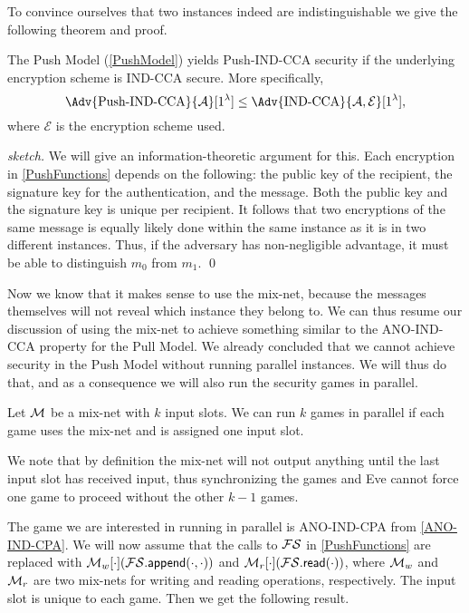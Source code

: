 To convince ourselves that two instances indeed are indistinguishable we give 
the following theorem and proof.

\begin{theorem}
  The Push Model (\cref{PushModel}) yields Push-IND-CCA security if the 
  underlying encryption scheme is IND-CCA secure.
  More specifically,
  \begin{equation*}
    \Adv{\text{Push-IND-CCA}}{\A}[1^\lambda]\leq \Adv{\text{IND-CCA}}{\A, 
      \mathcal{E}}[1^\lambda],
  \end{equation*}
  where \(\mathcal{E}\) is the encryption scheme used.
\end{theorem}

\begin{proof}[sketch]
  We will give an information-theoretic argument for this.
  Each encryption in \cref{PushFunctions} depends on the following:
  the public key of the recipient, the signature key for the authentication, 
  and the message.
  Both the public key and the signature key is unique per recipient.
  It follows that two encryptions of the same message is equally likely done 
  within the same instance as it is in two different instances.
  Thus, if the adversary has non-negligible advantage, it must be able to 
  distinguish \(m_0\) from \(m_1\).
  \qed{}
\end{proof}

Now we know that it makes sense to use the mix-net, because the messages 
themselves will not reveal which instance they belong to.
We can thus resume our discussion of using the mix-net to achieve something 
similar to the ANO-IND-CCA property for the Pull Model.
We already concluded that we cannot achieve security in the Push Model without 
running parallel instances.
We will thus do that, and as a consequence we will also run the security games 
in parallel.

\begin{definition}
  Let \(\operatorname{\mathcal{M}}\) be a mix-net with \(k\) input slots.
  We can run \(k\) games in parallel if each game uses the mix-net and is 
  assigned one input slot.
\end{definition}

We note that by definition the mix-net will not output anything until the last
input slot has received input, thus synchronizing the games and Eve cannot 
force one game to proceed without the other \(k-1\) games.

The game we are interested in running in parallel is ANO-IND-CPA from 
\cref{ANO-IND-CPA}.
We will now assume that the calls to \(\FS\) in \cref{PushFunctions} are 
replaced with \(\M_w[\cdot](\fswrite[\cdot][\cdot])\) and 
\(\M_r[\cdot](\fsread[\cdot])\), where \(\operatorname{\mathcal{M}}_w\) and \(\operatorname{\mathcal{M}}_r\) are two mix-nets 
for writing and reading operations, respectively.
The input slot is unique to each game.
Then we get the following result.

